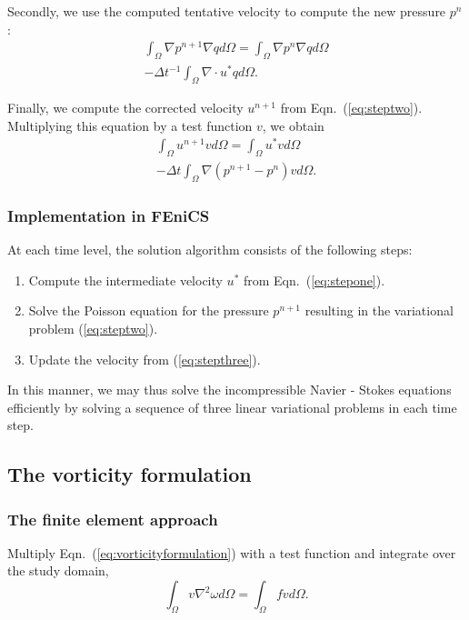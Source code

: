 \documentclass[11pt]{article}
\numberwithin{figure}{section}  %
\numberwithin{equation}{section}  %
\begin{document}
\begin{multicols}{2}
Secondly, we use the computed tentative velocity to compute the new pressure $p^n$:
\begin{multline}\label{eq:steptwo}
	\int_\Omega\nabla{p}^{n+1}\nabla{q}d\Omega = \int_\Omega\nabla{p}^n\nabla{q}d\Omega \\
	- \Delta{t}^{-1}\int_\Omega\nabla\cdot{u}^*qd\Omega.
\end{multline}

Finally, we compute the corrected velocity $u^{n+1}$ from Eqn.\ (\ref{eq:steptwo}). Multiplying this equation by a test function $v$, we obtain
\begin{multline}\label{eq:stepthree}
	\int_\Omega{u}^{n+1}vd\Omega = \int_\Omega{u}^*vd\Omega \\
	- \Delta{t}\int_\Omega\nabla(p^{n+1}-p^n)vd\Omega.
\end{multline}

\subsubsection{Implementation in FEniCS}

At each time level, the solution algorithm consists of the following steps:
\begin{enumerate}
	\item{Compute the intermediate velocity $u^*$ from Eqn.\ (\ref{eq:stepone}).}
	\item{Solve the Poisson equation for the pressure $p^{n+1}$ resulting in the variational problem (\ref{eq:steptwo}).}
	\item{Update the velocity from (\ref{eq:stepthree}).}
\end{enumerate}

In this manner, we may thus solve the incompressible Navier - Stokes equations efficiently by solving a sequence of three linear variational problems in each time step.

\subsection{The vorticity formulation}

\subsubsection{The finite element approach}

Multiply Eqn.\ (\ref{eq:vorticityformulation}) with a test function and integrate over the study domain,
\begin{equation}
    \int_\Omega{v}\nabla^2\omega{d}\Omega = \int_\Omega{f}vd\Omega.
\end{equation}


\end{multicols}
\end{document}
